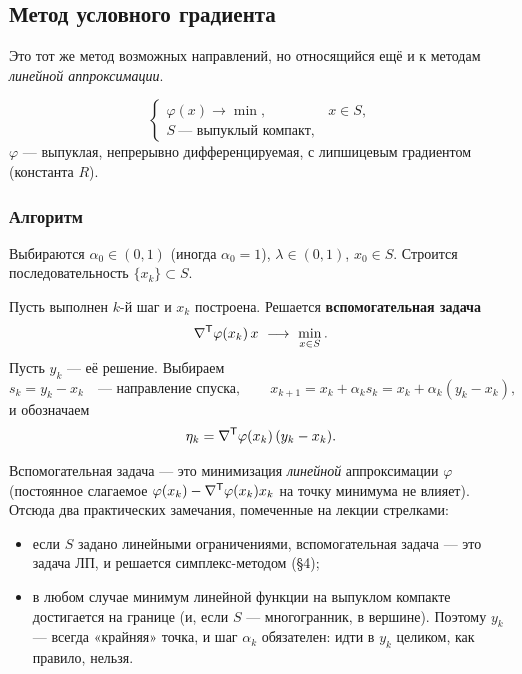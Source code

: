 \subsection{Метод условного градиента}
\label{subsec:cond-gradient}

Это тот же метод возможных направлений, но относящийся ещё и к методам
\emph{линейной аппроксимации}.

\[
  \begin{cases}
    \varphi(x) \to \min , & x \in S , \\
    S \ \text{— выпуклый компакт} ,
  \end{cases}
\]
$\varphi$ — выпуклая, непрерывно дифференцируемая, с липшицевым градиентом
(константа $R$).

\subsubsection*{Алгоритм}

Выбираются $\alpha_0 \in (0,1)$ (иногда $\alpha_0 = 1$), $\lambda \in (0,1)$,
$x_0 \in S$. Строится последовательность $\{x_k\} \subset S$.

Пусть выполнен $k$-й шаг и $x_k$ построена. Решается \textbf{вспомогательная
задача}
\[
  \nabla\T\varphi(x_k)\, x \ \longrightarrow\ \min_{x \in S} .
\]
Пусть $y_k$ — её решение. Выбираем
\[
  s_k = y_k - x_k \quad\text{— направление спуска},
  \qquad
  x_{k+1} = x_k + \alpha_k s_k = x_k + \alpha_k (y_k - x_k) ,
\]
и обозначаем
\[
  \eta_k = \nabla^{\mathsf{T}}\varphi(x_k)\,(y_k - x_k) .
\]

\begin{idea}
Вспомогательная задача — это минимизация \emph{линейной} аппроксимации
$\varphi$ (постоянное слагаемое $\varphi(x_k) - \nabla^{\mathsf{T}}\varphi(x_k)x_k$ на
точку минимума не влияет). Отсюда два практических замечания, помеченные на
лекции стрелками:
\begin{itemize}[nosep,left=0pt]
  \item если $S$ задано линейными ограничениями, вспомогательная задача — это
        задача ЛП, и решается симплекс-методом (\S4);
  \item в любом случае минимум линейной функции на выпуклом компакте
        достигается на границе (и, если $S$ — многогранник, в вершине).
        Поэтому $y_k$ — всегда «крайняя» точка, и шаг $\alpha_k$ обязателен:
        идти в $y_k$ целиком, как правило, нельзя.
\end{itemize}
\end{idea}

